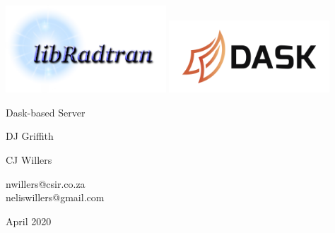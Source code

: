 
\thispagestyle{empty}

{
\sffamily
\centering
\large

~\vspace{\fill}

\vspace{2cm}
\includegraphics[width=0.45\textwidth]{pic/libradtran.png}
\includegraphics[width=0.45\textwidth]{pic/dask.png}

\vspace{3cm}
{\huge Dask-based \libradtran{} Server }

\vspace{1.5cm}
{\Large DJ Griffith }


\vspace{1.5cm}
{\Large CJ Willers }

\vspace{2mm}
nwillers@csir.co.za\\
neliswillers@gmail.com


\vspace{\fill}

April 2020

}

\clearpage
\tableofcontents*

\clearpage
\listoffigures*

%

\clearpage
\listoftodos 